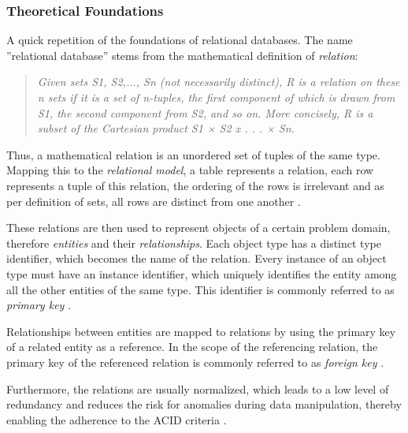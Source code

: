 \subsubsection{Theoretical Foundations} \label{sec:Theoretical Foundations Relational Database}
A quick repetition of the foundations of relational databases. The name ''relational database'' stems from the mathematical definition of \emph{relation}: 

\begin{quote}
	\textit{Given sets S1, S2,..., Sn (not necessarily distinct), R is a relation on these n sets if it is a set of n-tuples, the first component of which is drawn from S1, the second component from S2, and so on. More concisely, R is a subset of the Cartesian product S1 × S2 x . . . × Sn.}
	\cite{RelationalDatabaseModel}
\end{quote}

Thus, a mathematical relation is an unordered set of tuples of the same type. Mapping this to the \emph{relational model}, a table represents a relation, each row represents a tuple of this relation, the ordering of the rows is irrelevant and as per definition of sets, all rows are distinct from one another \cite{RelationalDatabaseModel}.\par
These relations are then used to represent objects of a certain problem domain, therefore \emph{entities} and their \emph{relationships}. Each object type has a distinct type identifier, which becomes the name of the relation. Every instance of an object type must have an instance identifier, which uniquely identifies the entity among all the other entities of the same type. This identifier is commonly referred to as \emph{primary key} \cite{RelationalDatabaseModel}.\par
Relationships between entities are mapped to relations by using the primary key of a related entity as a reference. In the scope of the referencing relation, the primary key of the referenced relation is commonly referred to as \emph{foreign key} \cite{RelationalDatabaseModel}.\par
Furthermore, the relations are usually normalized, which leads to a low level of redundancy and reduces the risk for anomalies during data manipulation, thereby enabling the adherence to the ACID criteria \cite{RelationalDatabaseModel}.\\


